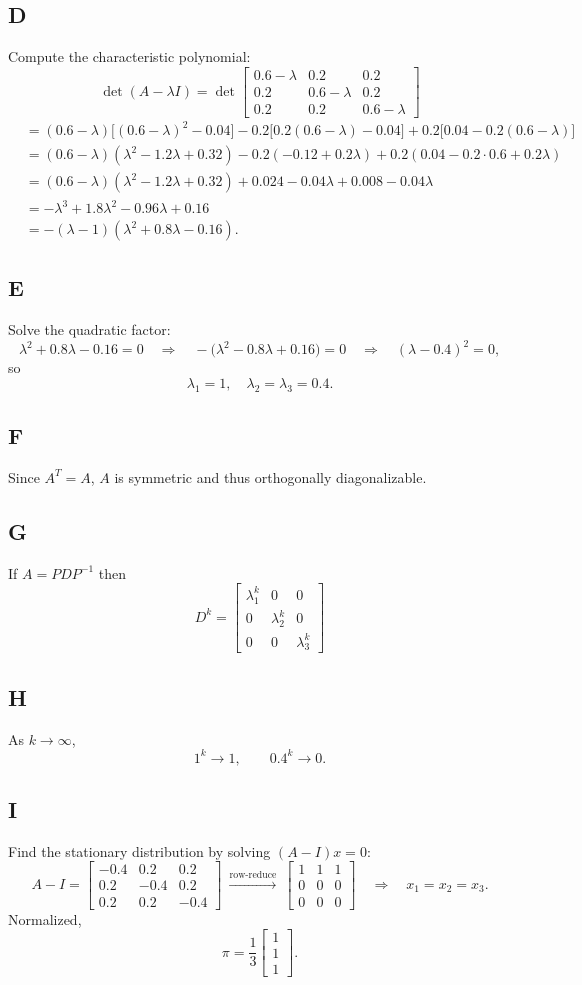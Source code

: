 \documentclass{article}
\newcommand{\mat}[1]{\begin{bmatrix}#1\end{bmatrix}}
\newcommand{\vect}[1]{\begin{bmatrix}#1\end{bmatrix}}
\begin{document}
\subsection*{D}
Compute the characteristic polynomial:
\[
\det(A-\lambda I)
=\det\mat{
0.6-\lambda & 0.2 & 0.2\\
0.2 & 0.6-\lambda & 0.2\\
0.2 & 0.2 & 0.6-\lambda
}
\]
\begin{align*}
&=(0.6-\lambda)\bigl[(0.6-\lambda)^2-0.04\bigr]
-0.2\bigl[0.2(0.6-\lambda)-0.04\bigr]
+0.2\bigl[0.04-0.2(0.6-\lambda)\bigr]\\
&=(0.6-\lambda)(\lambda^2-1.2\lambda+0.32)
-0.2(-0.12+0.2\lambda)
+0.2(0.04-0.2\cdot0.6+0.2\lambda)\\
&=(0.6-\lambda)(\lambda^2-1.2\lambda+0.32)
+0.024-0.04\lambda
+0.008-0.04\lambda\\
&=-\lambda^3+1.8\lambda^2-0.96\lambda+0.16\\
&=-(\lambda-1)(\lambda^2+0.8\lambda-0.16).
\end{align*}

\subsection*{E}
Solve the quadratic factor:
\[
\lambda^2+0.8\lambda-0.16=0
\quad\Longrightarrow\quad
-\bigl(\lambda^2-0.8\lambda+0.16\bigr)=0
\quad\Longrightarrow\quad
(\lambda-0.4)^2=0,
\]
so
\[
\lambda_1=1,\quad \lambda_2=\lambda_3=0.4.
\]

\subsection*{F}
Since $A^T=A$, $A$ is symmetric and thus orthogonally diagonalizable.

\subsection*{G}
If $A=PDP^{-1}$ then
\[
  D^k=\begin{bmatrix}
    \lambda_1^k & 0 & 0\\
    0& \lambda_2^k & 0\\
    0& 0 & \lambda_3^k
    \end{bmatrix}
\]

\subsection*{H}
As $k\to\infty$,
\[
1^k\to1,\qquad 0.4^k\to0.
\]

\subsection*{I}
Find the stationary distribution by solving $(A-I)x=0$:
\[
A-I=\mat{
-0.4 & 0.2 & 0.2\\
0.2  & -0.4& 0.2\\
0.2  & 0.2 & -0.4
}
\ \xrightarrow{\text{row‐reduce}}\ 
\mat{
1 & 1 & 1\\
0 & 0 & 0\\
0 & 0 & 0
}
\quad\Longrightarrow\quad
x_1=x_2=x_3.
\]
Normalized,
\[
\pi=\frac1{3}\vect{1\\1\\1}.
\]
\end{document}
